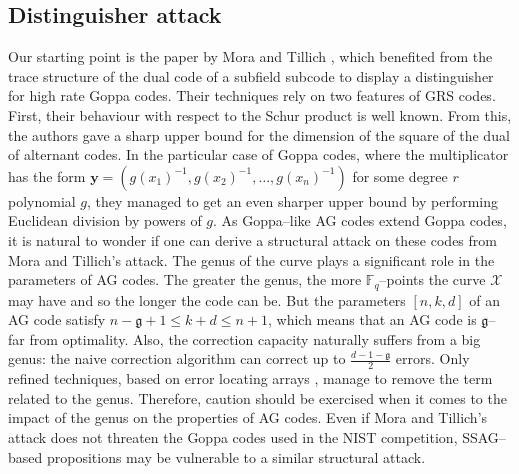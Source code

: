 \documentclass[a4paper]{amsart}
\theoremstyle{definition}
\theoremstyle{remark}
\newcommand{\calX}{\mathcal{X}}
\newcommand{\F}{\mathbb{F}}
\begin{document}
\subsection*{Distinguisher attack}
Our starting point is the paper by Mora and Tillich \cite{MT21}, which benefited from the trace structure of the dual code of a subfield subcode to display a distinguisher for high rate Goppa codes. Their techniques rely on two features of GRS codes. First, their behaviour with respect to the Schur product is well known. From this, the authors gave a sharp upper bound for the dimension of the square of the dual of alternant codes. In the particular case of Goppa codes, where the multiplicator has the form $\mathbf{y}=(g(x_1)^{-1},g(x_2)^{-1},\dots,g(x_n)^{-1})$ for some degree $r$ polynomial $g$, they managed to get an even sharper upper bound by performing Euclidean division by powers of $g$.
As Goppa--like AG codes extend Goppa codes, it is natural to wonder if one can derive a structural attack on these codes from Mora and Tillich's attack. The genus of the curve plays a significant role in the parameters of AG codes. The greater the genus, the more $\F_q$--points the curve $\calX$ may have and so the longer the code can be. But the parameters $[n,k,d]$ of an AG code satisfy $n-\mathfrak{g}+1 \leq k+d \leq n+1$, which means that an AG code is $\mathfrak{g}$--far from optimality. Also, the correction capacity naturally suffers from a big genus: the naive correction algorithm can correct up to $\frac{d-1-\mathfrak{g}}{2}$ errors. Only refined techniques, based on error locating arrays \cite{CP20}, manage to remove the term related to the genus. Therefore, caution should be exercised when it comes to the impact of the genus on the properties of AG codes.
Even if Mora and Tillich's attack does not threaten the Goppa codes used in the NIST competition, SSAG--based propositions may be vulnerable to a similar structural attack. 

\medskip
\end{document}
